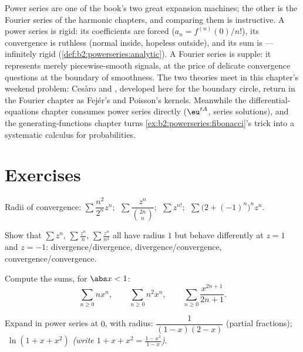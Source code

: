 \begin{remark}
Power series are one of the book's two great expansion
machines; the other is the Fourier series of the harmonic
chapters, and comparing them is instructive. A power series is
rigid: its coefficients are forced ($a_n = f^{(n)}(0)/n!$),
its convergence is ruthless (normal inside, hopeless outside),
and its sum is  --- infinitely rigid
(\cref{def:b2:powerseries:analytic}). A Fourier series is
supple: it represents merely piecewise-smooth signals, at the
price of delicate convergence questions at the boundary of
smoothness. The two theories meet in this chapter's weekend
problem: Ces\`aro and , developed here for the
boundary circle, return in the Fourier chapter as Fej\'er's
and Poisson's kernels. Meanwhile the differential-equations
chapter consumes power series directly ($\eu^{tA}$, series
solutions), and the generating-functions chapter turns
\cref{ex:b2:powerseries:fibonacci}'s trick into a systematic
calculus for probabilities.
\end{remark}

\section{Exercises}

\begin{exercise}[$\star$]\label{exo:b2:powerseries:1}
Radii of convergence:
$\sum \dfrac{n^2}{2^n}z^n$; $\;\sum \dfrac{z^n}{\binom{2n}{n}}$;
$\;\sum z^{n!}$; $\;\sum \bigl(2 + (-1)^n\bigr)^n z^n$.
\end{exercise}

\begin{exercise}[$\star$]\label{exo:b2:powerseries:2}
Show that $\sum z^n$, $\sum \frac{z^n}{n}$, $\sum \frac{z^n}{n^2}$
all have radius $1$ but behave differently at $z = 1$ and $z = -1$:
divergence/divergence, divergence/convergence,
convergence/convergence.
\end{exercise}

\begin{exercise}[$\star$]\label{exo:b2:powerseries:3}
Compute the sums, for $\abs x < 1$:
\[
\sum_{n\geq0} n x^n,
\qquad
\sum_{n\geq0} n^2 x^n,
\qquad
\sum_{n\geq0} \frac{x^{2n+1}}{2n+1} .
\]
\end{exercise}

\begin{exercise}[$\star\star$]\label{exo:b2:powerseries:4}
Expand in power series at $0$, with radius: $\dfrac{1}{(1-x)(2-x)}$
(partial fractions); $\;\ln(1 + x + x^2)$ \emph{(write $1 + x + x^2
= \frac{1 - x^3}{1 - x}$)}.
\end{exercise}

